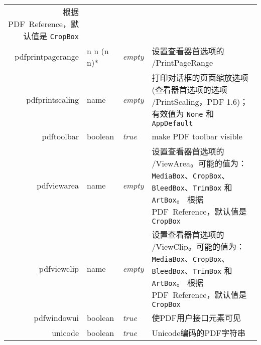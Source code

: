 \documentclass{article}
\begin{document}
\begin{longtable}{@{}>{\ttfamily}r>{\raggedright}p{}>{\itshape}lp{7cm}@{}}
  根据PDF~Reference，默认值是 \verb|CropBox|                                                                                                                                                                                                                                                             \\
  pdfprintpagerange   & n n (n n)*
                      & empty          & 设置查看器首选项的 /PrintPageRange                                                                                                                                                                                                                                \\
  pdfprintscaling     & name           & empty                     & 打印对话框的页面缩放选项(查看器首选项的选项 /PrintScaling，PDF 1.6)；有效值为 \verb|None| 和 \verb|AppDefault|                                                                                                                                           \\
  pdftoolbar          & boolean        & true                      & make PDF toolbar visible                                                                                                                                                                                                     \\
  pdfviewarea         & name           & empty                     & 设置查看器首选项的 /ViewArea。可能的值为：
  \verb|MediaBox|、\verb|CropBox|、
  \verb|BleedBox|、\verb|TrimBox| 和 \verb|ArtBox|。
  根据PDF~Reference，默认值是 \verb|CropBox|                                                                                                                                                                                                                                                             \\
  pdfviewclip         & name           & empty                     & 设置查看器首选项的 /ViewClip。可能的值为：
  \verb|MediaBox|、\verb|CropBox|、
  \verb|BleedBox|、\verb|TrimBox| 和 \verb|ArtBox|。
  根据PDF~Reference，默认值是 \verb|CropBox|                                                                                                                                                                                                                                                             \\
  pdfwindowui         & boolean        & true                      & 使PDF用户接口元素可见                                                                                                                                                                                                                 \\
  unicode             & boolean        & true                      & Unicode编码的PDF字符串                                                                                                                                                                                                             \\
\end{longtable}
\end{document}
